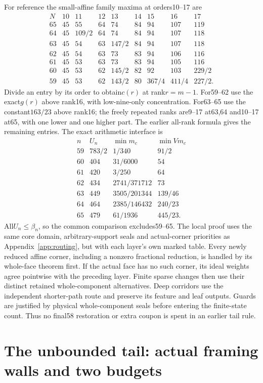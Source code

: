 \documentclass[11pt]{article}
\theoremstyle{remark}\newtheorem{remark}[theorem]{Remark}
\begin{document}
For reference the small-affine family maxima at orders10--17 are
\[
\begin{array}{c|rrrrrrrr}
N&10&11&12&13&14&15&16&17\\\hline
65&45&55&64&74&84&94&107&119\\
64&45&109/2&64&74&84&94&107&118\\
63&45&54&63&147/2&84&94&107&118\\
62&45&54&63&73&83&94&106&116\\
61&45&53&63&73&83&94&105&116\\
60&45&53&62&145/2&82&92&103&229/2\\
59&45&53&62&143/2&80&367/4&411/4&227/2 .
\end{array}
\]
Divide an entry by its order to obtain$c(r)$ at rank$r=m-1$.
For59--62 use the exact$g(r)$ above rank16, with low-nine-only
concentration. For63--65 use the constant$163/23$ above rank16;
the freely repeated ranks are9--17 at63,64 and10--17 at65,
with one lower and one higher part. The earlier all-rank formula
gives the remaining entries.
The exact arithmetic interface is
\[
\begin{array}{c|r|c|c}
n&U_n&\min m_c&\min V m_c\\\hline
59&783/2&1/340&91/2\\
60&404&31/6000&54\\
61&420&3/250&64\\
62&434&2741/371712&73\\
63&449&3505/201344&139/46\\
64&464&2385/146432&240/23\\
65&479&61/1936&445/23 .
\end{array}
\]
All$U_n\le\beta_n$, so the common comparison excludes59--65.
The local proof uses the same core domain, arbitrary-support seals
and actual-corner priorities as Appendix~\ref{app:routing}, but with
each layer's own marked table. Every newly reduced affine corner,
including a nonzero fractional reduction, is handled by its
whole-face theorem first. If the actual face has no such corner,
its ideal weights agree pointwise with the preceding layer.
Finite sparse changes then use their
distinct retained whole-component alternatives. Deep corridors use
the independent shorter-path route and preserve its feature and leaf
outputs. Guards are justified by physical whole-component seals
before entering the finite-state count. Thus no final58 restoration
or extra coupon is spent in an earlier tail rule.

\section{The unbounded tail: actual framing walls and two budgets}
\label{app:narrow-tail}
\end{document}
